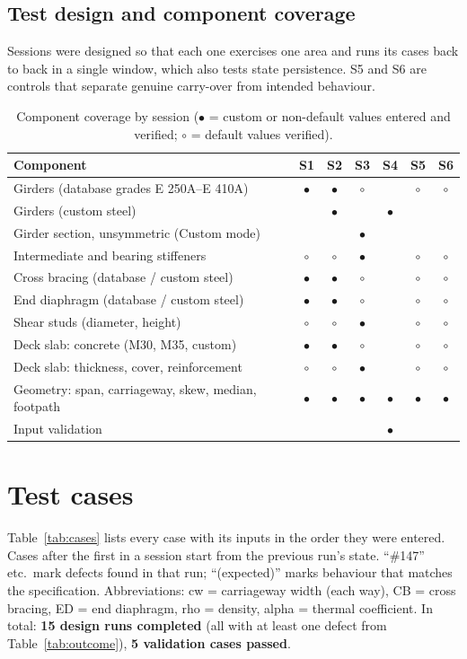 \documentclass[11pt,a4paper]{article}
\begin{document}
\subsection{Test design and component coverage}
Sessions were designed so that each one exercises one area and runs its cases back to back in a single window, which also
tests state persistence. S5 and S6 are controls that separate genuine carry-over from intended behaviour.
\begin{table}[htbp]
\caption{Component coverage by session ($\bullet$ = custom or non-default values entered and verified; $\circ$ = default values verified).}\label{tab:coverage}
\small
\begin{tabular}{@{}lcccccc@{}}
\toprule
\textbf{Component} & \textbf{S1} & \textbf{S2} & \textbf{S3} & \textbf{S4} & \textbf{S5} & \textbf{S6} \\
\midrule
Girders (database grades E 250A--E 410A) & $\bullet$ & $\bullet$ & $\circ$ & & $\circ$ & $\circ$ \\
Girders (custom steel) & & $\bullet$ & & $\bullet$ & & \\
Girder section, unsymmetric (Custom mode) & & & $\bullet$ & & & \\
Intermediate and bearing stiffeners & $\circ$ & $\circ$ & $\bullet$ & & $\circ$ & $\circ$ \\
Cross bracing (database / custom steel) & $\bullet$ & $\bullet$ & $\circ$ & & $\circ$ & $\circ$ \\
End diaphragm (database / custom steel) & $\bullet$ & $\bullet$ & $\circ$ & & $\circ$ & $\circ$ \\
Shear studs (diameter, height) & $\circ$ & $\circ$ & $\bullet$ & & $\circ$ & $\circ$ \\
Deck slab: concrete (M30, M35, custom) & $\bullet$ & $\bullet$ & $\circ$ & & $\circ$ & $\circ$ \\
Deck slab: thickness, cover, reinforcement & $\circ$ & $\circ$ & $\bullet$ & & $\circ$ & $\circ$ \\
Geometry: span, carriageway, skew, median, footpath & $\bullet$ & $\bullet$ & $\bullet$ & $\bullet$ & $\bullet$ & $\bullet$ \\
Input validation & & & & $\bullet$ & & \\
\bottomrule
\end{tabular}
\end{table}

\section{Test cases}\label{sec:cases}
Table~\ref{tab:cases} lists every case with its inputs in the order they were entered. Cases after the first in a session start
from the previous run's state. ``\#147'' etc.\ mark defects found in that run; ``(expected)'' marks behaviour that matches the
specification. Abbreviations: cw = carriageway width (each way), CB = cross bracing, ED = end diaphragm, rho = density,
alpha = thermal coefficient. In total: \textbf{15 design runs completed} (all with at least one defect from
Table~\ref{tab:outcome}), \textbf{5 validation cases passed}.
\clearpage
{\footnotesize\setlength{\tabcolsep}{3pt}}
\end{document}
